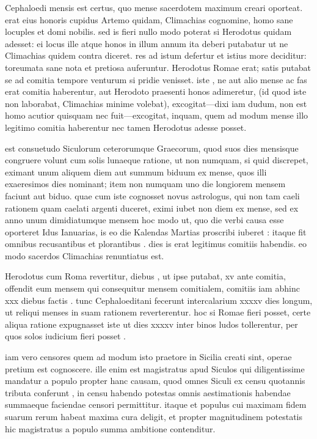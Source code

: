  Cephaloedi mensis est certus, quo mense sacerdotem maximum creari oporteat. erat eius honoris cupidus Artemo quidam, Climachias cognomine, homo sane locuples et domi nobilis. sed is fieri nullo modo poterat si Herodotus quidam adesset: ei locus ille atque honos in illum annum ita deberi putabatur ut ne Climachias quidem contra diceret. res ad istum defertur et istius more deciditur: toreumata sane nota et pretiosa auferuntur. Herodotus Romae erat; satis putabat se ad comitia tempore venturum si pridie venisset. iste , ne aut alio mense ac fas erat comitia haberentur, aut Herodoto praesenti honos adimeretur, (id quod iste non laborabat, Climachias minime volebat), excogitat—dixi iam dudum, non est homo acutior quisquam nec fuit—excogitat, inquam, quem ad modum mense illo legitimo comitia haberentur nec tamen Herodotus adesse posset.

 est consuetudo Siculorum ceterorumque Graecorum, quod suos dies mensisque congruere volunt cum solis lunaeque ratione, ut non numquam, si quid discrepet, eximant unum aliquem diem aut summum biduum ex mense, quos illi exaeresimos dies nominant; item non numquam uno die longiorem mensem faciunt aut biduo. quae cum iste cognosset novus astrologus, qui non tam caeli rationem quam caelati argenti duceret, eximi iubet non diem ex mense, sed ex anno unum dimidiatumque mensem hoc modo ut, quo die verbi causa esse oporteret Idus Ianuarias, is eo die Kalendas Martias proscribi iuberet : itaque fit omnibus recusantibus et plorantibus . dies is erat legitimus comitiis habendis. eo modo sacerdos Climachias renuntiatus est.

 Herodotus cum Roma revertitur, diebus , ut ipse putabat, xv ante comitia, offendit eum mensem qui consequitur mensem comitialem, comitiis iam abhinc xxx diebus factis . tunc Cephaloeditani fecerunt intercalarium xxxxv dies longum, ut reliqui menses in suam rationem reverterentur. hoc si Romae fieri posset, certe aliqua ratione expugnasset iste ut dies xxxxv inter binos ludos tollerentur, per quos solos iudicium fieri posset .

 iam vero censores quem ad modum isto praetore in Sicilia creati sint, operae pretium est cognoscere. ille enim est magistratus apud Siculos qui diligentissime mandatur a populo propter hanc causam, quod omnes Siculi ex censu quotannis tributa conferunt , in censu habendo potestas omnis aestimationis habendae summaeque faciendae censori permittitur. itaque et populus cui maximam fidem suarum rerum habeat maxima cura deligit, et propter magnitudinem potestatis hic magistratus a populo summa ambitione contenditur.

